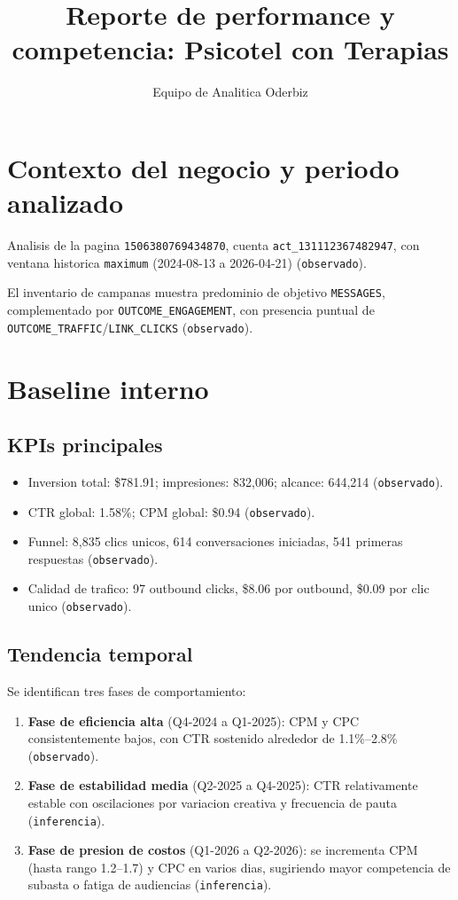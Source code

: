 \documentclass[9pt,a4paper,twocolumn,twoside]{tau-class/tau}
\title{Reporte de performance y competencia: Psicotel con Terapias}
\author[a,1]{Equipo de Analitica Oderbiz}
\affil[a]{Unidad de Inteligencia Comercial}
\begin{document}
\maketitle
\thispagestyle{firststyle}

\section{Contexto del negocio y periodo analizado}

Analisis de la pagina \texttt{1506380769434870}, cuenta \texttt{act\_131112367482947}, con ventana historica \texttt{maximum} (2024-08-13 a 2026-04-21) (\texttt{observado}).

El inventario de campanas muestra predominio de objetivo \texttt{MESSAGES}, complementado por \texttt{OUTCOME\_ENGAGEMENT}, con presencia puntual de \texttt{OUTCOME\_TRAFFIC}/\texttt{LINK\_CLICKS} (\texttt{observado}).

\section{Baseline interno}

\subsection{KPIs principales}
\begin{itemize}
  \item Inversion total: \$781.91; impresiones: 832{,}006; alcance: 644{,}214 (\texttt{observado}).
  \item CTR global: 1.58\%; CPM global: \$0.94 (\texttt{observado}).
  \item Funnel: 8{,}835 clics unicos, 614 conversaciones iniciadas, 541 primeras respuestas (\texttt{observado}).
  \item Calidad de trafico: 97 outbound clicks, \$8.06 por outbound, \$0.09 por clic unico (\texttt{observado}).
\end{itemize}

\subsection{Tendencia temporal}
Se identifican tres fases de comportamiento:
\begin{enumerate}
  \item \textbf{Fase de eficiencia alta} (Q4-2024 a Q1-2025): CPM y CPC consistentemente bajos, con CTR sostenido alrededor de 1.1\%--2.8\% (\texttt{observado}).
  \item \textbf{Fase de estabilidad media} (Q2-2025 a Q4-2025): CTR relativamente estable con oscilaciones por variacion creativa y frecuencia de pauta (\texttt{inferencia}).
  \item \textbf{Fase de presion de costos} (Q1-2026 a Q2-2026): se incrementa CPM (hasta rango 1.2--1.7) y CPC en varios dias, sugiriendo mayor competencia de subasta o fatiga de audiencias (\texttt{inferencia}).
\end{enumerate}
\end{document}
